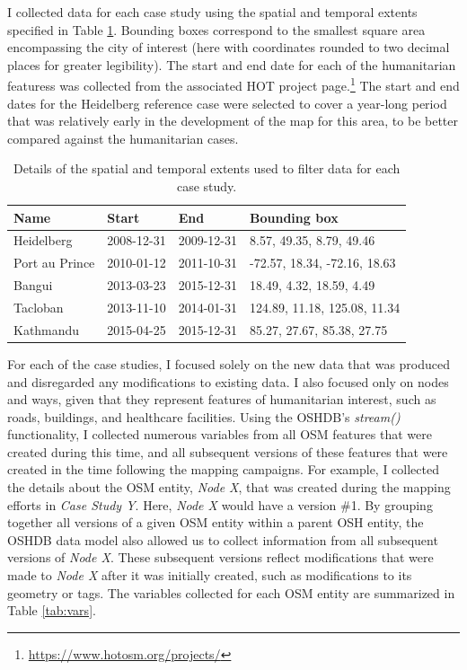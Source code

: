 I collected data for each case study using the spatial and temporal extents specified in Table \ref{tab:cases}. Bounding boxes correspond to the smallest square area encompassing the city of interest (here with coordinates rounded to two decimal places for greater legibility). The start and end date for each of the humanitarian featuress was collected from the associated HOT project page.\footnote{\url{https://www.hotosm.org/projects/}} The start and end dates for the Heidelberg reference case were selected to cover a year-long period that was relatively early in the development of the map for this area, to be better compared against the humanitarian cases. 

\begin{table}
\centering
\caption{Details of the spatial and temporal extents used to filter data for each case study.}
\label{tab:cases}
\begin{tabular}{llll}
\toprule
Name                     & Start      & End        & Bounding box                 \\
\midrule
Heidelberg               & 2008-12-31 & 2009-12-31 & 8.57, 49.35, 8.79, 49.46     \\
Port au Prince         & 2010-01-12 & 2011-10-31 & -72.57, 18.34, -72.16, 18.63 \\
Bangui & 2013-03-23 & 2015-12-31 & 18.49, 4.32, 18.59, 4.49     \\
Tacloban           & 2013-11-10 & 2014-01-31 & 124.89, 11.18, 125.08, 11.34 \\
Kathmandu         & 2015-04-25 & 2015-12-31 & 85.27, 27.67, 85.38, 27.75  \\
\bottomrule
\end{tabular}
\end{table}

For each of the case studies, I focused solely on the new data that was produced and disregarded any modifications to existing data. I also focused only on nodes and ways, given that they represent features of humanitarian interest, such as roads, buildings, and healthcare facilities. Using the OSHDB's \textit{stream()} functionality, I collected numerous variables from all OSM features that were created during this time, and all subsequent versions of these features that were created in the time following the mapping campaigns. For example, I collected the details about the OSM entity, \textit{Node X}, that was created during the mapping efforts in \textit{Case Study Y}. Here, \textit{Node X} would have a version \#1. By grouping together all versions of a given OSM entity within a parent OSH entity, the OSHDB data model also allowed us to collect information from all subsequent versions of \textit{Node X}. These subsequent versions reflect modifications that were made to \textit{Node X} after it was initially created, such as modifications to its geometry or tags. The variables collected for each OSM entity are summarized in Table \ref{tab:vars}. 

